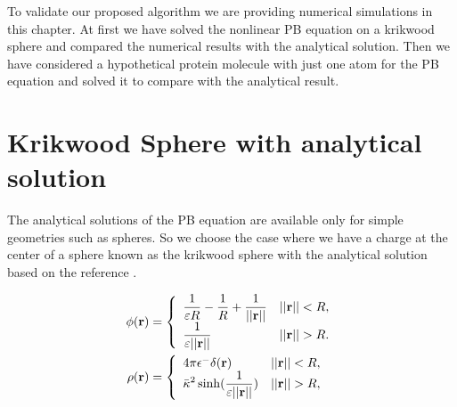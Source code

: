 To validate our proposed algorithm we are providing numerical simulations in this chapter. At first we have solved the nonlinear PB equation on a krikwood sphere and compared the numerical results with the analytical solution. Then we have considered a hypothetical protein molecule with just one atom for the PB equation and solved it to compare with the analytical result. 


\section{Krikwood Sphere with analytical solution}
\label{krik}

The analytical solutions of the PB equation are available only for simple geometries such as spheres. So we choose the case where we have a charge at the center of a sphere known as the krikwood sphere  with the analytical solution based on the reference \cite{Geng2013_Fully}. 



\begin{align}\label{Eq_sphere1}
   	\phi({\bf r})&=\left\{\begin{array}{lc}\displaystyle\frac{1}{\varepsilon R}-\frac{1}{R}+\displaystyle\frac{1}{||{\bf r}||} & ||{\bf r}||<R, \\
	\displaystyle\frac{1}{\varepsilon ||{\bf r}||}& ||{\bf r}||>R.\end{array}\right.\\\label{Eq_sphere2}
	  	\rho({\bf r})&=\left\{\begin{array}{lc}4\pi \epsilon^-\delta ({\bf r)} & ||{\bf r}||<R, \\ \displaystyle\bar{\kappa}^2\sinh (\frac{1}{\varepsilon ||{\bf r}||}) & ||{\bf r}||>R,\end{array}\right.
\end{align}


